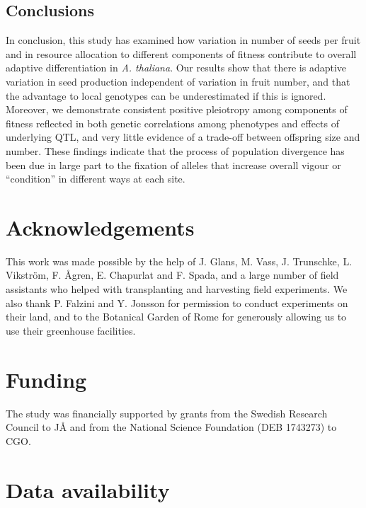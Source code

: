 \documentclass[]{article}
\begin{document}
\hypertarget{conclusions}{%
\subsection{Conclusions}\label{conclusions}}

In conclusion, this study has examined how variation in number of seeds per fruit and in resource allocation to different components of fitness contribute to overall adaptive differentiation in \emph{A. thaliana}. Our results show that there is adaptive variation in seed production independent of variation in fruit number, and that the advantage to local genotypes can be underestimated if this is ignored. Moreover, we demonstrate consistent positive pleiotropy among components of fitness reflected in both genetic correlations among phenotypes and effects of underlying QTL, and very little evidence of a trade-off between offspring size and number. These findings indicate that the process of population divergence has been due in large part to the fixation of alleles that increase overall vigour or ``condition'' in different ways at each site.

\hypertarget{acknowledgements}{%
\section{Acknowledgements}\label{acknowledgements}}

This work was made possible by the help of J. Glans, M. Vass, J. Trunschke, L. Vikström, F. Ågren, E. Chapurlat and F. Spada, and a large number of field assistants who helped with transplanting and harvesting field experiments. We also thank P. Falzini and Y. Jonsson for permission to conduct experiments on their land, and to the Botanical Garden of Rome for generously allowing us to use their greenhouse facilities.

\hypertarget{funding}{%
\section{Funding}\label{funding}}

The study was financially supported by grants from the Swedish Research Council to JÅ and from the National Science Foundation (DEB 1743273) to CGO.

\hypertarget{data-availability}{%
\section{Data availability}\label{data-availability}}
\end{document}
